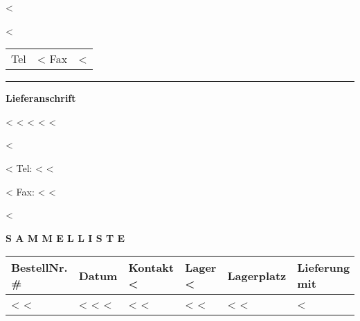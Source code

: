 \documentclass[twoside]{scrartcl}
\begin{document}
\newlength{\descrwidth}\setlength{\descrwidth}{9cm}
\fontsize{10pt}{12pt}\selectfont

\pagestyle{myheadings}
\thispagestyle{empty}

\vspace*{-1.3cm}

\parbox{\textwidth}{
  \parbox[b]{.42\textwidth}{
    <%

    <%
  }\hfill
  \begin{tabular}[b]{rr@{}}
  Tel & <%
  Fax & <%
  \end{tabular}

  \rule[1.5ex]{\textwidth}{0.5pt}
}

\vspace*{0.5cm}

\parbox[t]{1cm}{\hfill}
\parbox[t]{.5\textwidth}{
  \textbf{Lieferanschrift}
} \hfill

\vspace{0.7cm}

\parbox[t]{1cm}{\hfill}
\parbox[t]{.5\textwidth}{

<%
<%
<%
<%
<%
}
\parbox[t]{.4\textwidth}{
  <%

  <%
  Tel: <%
  <%

  <%
  Fax: <%
  <%

  <%
}
\hfill

\vspace{1cm}

\textbf{S A M M E L L I S T E}
\hfill

\vspace{1cm}

\begin{tabularx}{\textwidth}{*{6}{|X}|} \hline
  \textbf{BestellNr. \#} & \textbf{Datum} & \textbf{Kontakt}
  <%
  & \textbf{Lager}
  <%
  & \textbf{Lagerplatz} & \textbf{Lieferung mit} \\ [0.5em]
  \hline
  <%
  <%
  & <%
  <%
  <%
  & <%
  <%
  & <%
  <%
  & <%
  <%
  & <%
  \hline
\end{tabularx}
\end{document}
